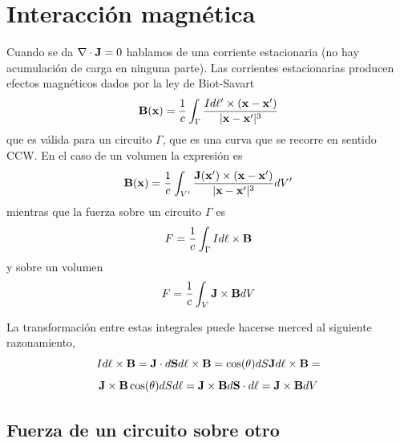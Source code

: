 \documentclass[10pt,oneside]{CBFT_book}
\begin{document}
\section{Interacción magnética}

Cuando se da $\nabla \cdot \vb{J}=0$ hablamos de una corriente estacionaria (no hay acumulación de carga en
ninguna parte). Las corrientes estacionarias producen efectos magnéticos dados por la ley de Biot-Savart
\[
	\vb{B}(\vb{x}) = \frac{1}{c} \int_\Gamma \frac{I d\vb{\ell}' \times (\vb{x} - \vb{x}')}{|\vb{x} - \vb{x}'|^3} 
\]
que es válida para un circuito $\Gamma$, que es una curva que se recorre en sentido CCW.
En el caso de un volumen la expresión es 
\[
	\vb{B}(\vb{x}) = \frac{1}{c} \int_{V'} \frac{ \vb{J}(\vb{x}') \times (\vb{x} - \vb{x}')}{|\vb{x} - \vb{x}'|^3} 
dV'
\]
mientras que la fuerza sobre un circuito $\Gamma$ es
\[
	F = \frac{1}{c} \int_\Gamma I d\vb{\ell} \times \vb{B}
\]
y sobre un volumen 
\[
	F = \frac{1}{c} \int_V \vb{J} \times \vb{B} dV
\]

La transformación entre estas integrales puede hacerse merced al siguiente razonamiento,
\[
  	I d\vb{\ell} \times \vb{B} = \vb{J}  \cdot d\vb{S} d\vb{\ell}  \times \vb{B} =
  	\cos(\theta) dS \vb{J} d\ell \times \vb{B} = 
\]
\[
	\vb{J} \times \vb{B}  \cos(\theta) dS d\ell  = \vb{J} \times \vb{B}  d\vb{S} \cdot d\vb{\ell}  = 
	\vb{J} \times \vb{B}  dV 
\]

\subsection{Fuerza de un circuito sobre otro}
\end{document}
